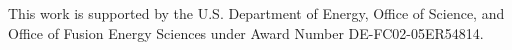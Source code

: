 \documentclass[aip, pop, preprint]{revtex4-1}
\begin{document}
This work is supported by the U.S. Department of Energy, Office of Science, and Office of Fusion Energy Sciences under Award Number DE-FC02-05ER54814.



%
%

%



%


\end{document}
